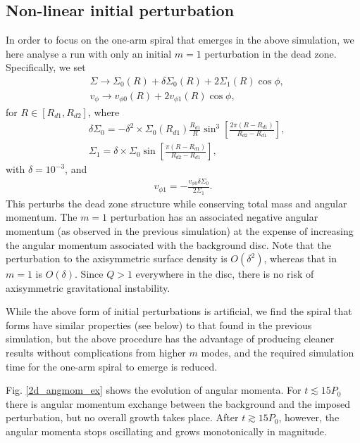 \subsection{Non-linear initial perturbation}\label{fargo_nonlin}
In order to focus on the one-arm spiral that emerges in the above
simulation, we here analyse a run with only an initial $m=1$
perturbation in the dead zone. Specifically, we set
\begin{align}
  &\Sigma \to \Sigma_0(R) + \delta\Sigma_0(R) + 2\Sigma_1(R)\cos{\phi},\\
  &v_\phi  \to v_{\phi 0}(R) + 2v_{\phi 1}(R)\cos{\phi},
\end{align}
for $R\in[R_{d1},R_{d2}]$, where
\begin{align}
  &\delta\Sigma_0 =
  -\delta^2\times\Sigma_0(R_{d1})\frac{R_{d1}}{R}\sin^3{\left[\frac{2\pi\left(R-R_{d1}\right)}{R_{d2}-R_{d1}}\right]},\\ 
  &\Sigma_1 =
  \delta\times\Sigma_0\sin{\left[\frac{\pi\left(R-R_{d1}\right)}{R_{d2}-R_{d1}}\right]},  
\end{align}
with $\delta = 10^{-3}$, and
\begin{align}
  v_{\phi 1} = -\frac{v_{\phi 0}\delta\Sigma_0}{2\Sigma_1}. 
\end{align}
This perturbs the dead zone structure while conserving total mass and
angular momentum. The $m=1$ perturbation has an associated negative
angular momentum (as observed in the previous simulation) at the
expense of increasing the angular momentum associated with the
background disc. %
Note that the perturbation to the axisymmetric surface density is
$O(\delta^2)$, whereas that in $m=1$ is $O(\delta)$. Since $Q>1$
everywhere in the disc, there is no risk of axisymmetric gravitational
instability. 

While the above form of initial perturbations is artificial, we find 
the spiral that forms have similar properties (see below) to that found in the
previous simulation, but the above procedure has the 
advantage of producing cleaner results without complications from
higher $m$ modes, and the required simulation time for the one-arm
spiral to emerge is reduced. 

Fig. \ref{2d_angmom_ex} shows the evolution of angular momenta. For
$t\lesssim 15P_0$ there is angular momentum exchange between the
background and the imposed perturbation, but no overall growth takes
place. After $t\gtrsim15P_0$, however, the angular momenta stops 
oscillating and grows monotonically in magnitude.     

